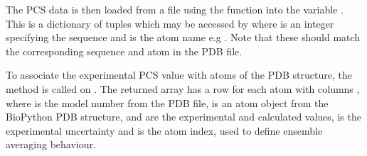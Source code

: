 \documentclass[a4paper,10pt,english,openany,oneside]{sphinxmanual}
\begin{document}
\begin{sphinxVerbatim}[commandchars=\\\{\}]
  
\end{sphinxVerbatim}

\sphinxAtStartPar
The PCS data is then loaded from a  file using the function {\hyperref[\detokenize{reference/generated/paramagpy.dataparse.read_pcs:paramagpy.dataparse.read_pcs}]{}} into the variable . This is a dictionary of  tuples which may be accessed by  where  is an integer specifying the sequence and  is the atom name e.g . Note that these should match the corresponding sequence and atom in the PDB file.

\begin{sphinxVerbatim}[commandchars=\\\{\}]
  
\end{sphinxVerbatim}

\sphinxAtStartPar
To associate the experimental PCS value with atoms of the PDB structure, the method {\hyperref[\detokenize{reference/generated/paramagpy.protein.CustomStructure.parse:paramagpy.protein.CustomStructure.parse}]{}} is called on . The returned array  has a row for each atom with columns , where  is the model number from the PDB file,  is an atom object from the BioPython PDB structure,  and  are the experimental and calculated values,  is the experimental uncertainty and  is the atom index, used to define ensemble averaging behaviour.
\end{document}
